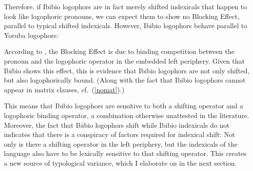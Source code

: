 \documentclass[output=paper]{langscibook}
\begin{document}
Therefore, if Ibibio logophors are in fact merely shifted indexicals that happen to look like logophoric pronouns, we can expect them to show no  Blocking Effect, parallel to typical shifted indexicals. However, Ibibio logophors behave parallel to Yoruba logophors:
\begin{exe}
\end{exe}

According to \citet{Anand2006}, the  Blocking Effect is due to binding competition between the  pronoun and the logophoric operator in the embedded left periphery. Given that Ibibio shows this effect, this is evidence that Ibibio logophors are not only shifted, but also logophorically bound. (Along with the fact that Ibibio logophors cannot appear in matrix clauses, cf.\ (\ref{nomat}).)

This means that Ibibio logophors are sensitive to both a shifting operator and a logophoric binding operator, a combination otherwise unattested in the  literature. Moreover, the fact that Ibibio logophors shift while Ibibio indexicals do not indicates that there is a conspiracy of factors required for indexical shift: Not only is there a shifting operator in the left periphery, but the indexicals of the language also have to be lexically sensitive to that shifting operator. This creates a new source of typological variance, which I elaborate on in the next section.
\end{document}

